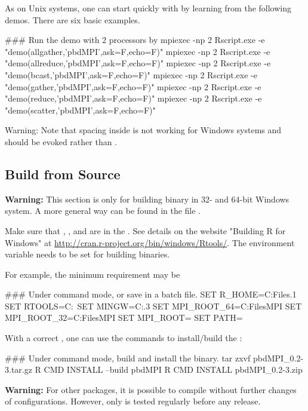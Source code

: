 As on Unix systems,
one can start quickly with  by learning from the
following demos. There are six basic examples.
\begin{Command}
### Run the demo with 2 processors by
mpiexec -np 2 Rscript.exe -e "demo(allgather,'pbdMPI',ask=F,echo=F)"
mpiexec -np 2 Rscript.exe -e "demo(allreduce,'pbdMPI',ask=F,echo=F)"
mpiexec -np 2 Rscript.exe -e "demo(bcast,'pbdMPI',ask=F,echo=F)"
mpiexec -np 2 Rscript.exe -e "demo(gather,'pbdMPI',ask=F,echo=F)"
mpiexec -np 2 Rscript.exe -e "demo(reduce,'pbdMPI',ask=F,echo=F)"
mpiexec -np 2 Rscript.exe -e "demo(scatter,'pbdMPI',ask=F,echo=F)"
\end{Command}
{\color{red}Warning:}
Note that spacing inside  is not working for Windows systems
and  should be evoked rather than .


\subsection[Build from Source]{Build from Source}
\label{sec:building_from_source}

{\color{red} \bf Warning:} This section is only for building binary in
32- and 64-bit Windows system. A more general way can be found in the file
.

Make sure that , , and  are in
the .
See details on the website "Building R for Windows" at
\url{http://cran.r-project.org/bin/windows/Rtools/}.
The environment variable 
needs to be set for building binaries.

For example, the minimum requirement may be
\begin{Command}
### Under command mode, or save in a batch file.
SET R_HOME=C:\Program Files\R{}.1
SET RTOOLS=C:\Rtools\bin\
SET MINGW=C:\Rtools{}.3\bin
SET MPI_ROOT_64=C:\Program Files\Miscrosoft MPI
SET MPI_ROOT_32=C:\Program Files\Miscrosoft MPI
SET MPI_ROOT=%
SET PATH=%
\end{Command}

With a correct , one can use the  commands
to install/build the \pkg{pbdMPI}:
\begin{Command}
### Under command mode, build and install the binary.
tar zxvf pbdMPI_0.2-3.tar.gz
R CMD INSTALL --build pbdMPI
R CMD INSTALL pbdMPI_0.2-3.zip
\end{Command}

{\color{red} \bf Warning:} For other  packages, it is possible
to compile without further changes of configurations. However, only
\pkg{pbdMPI} is tested regularly before any release.

